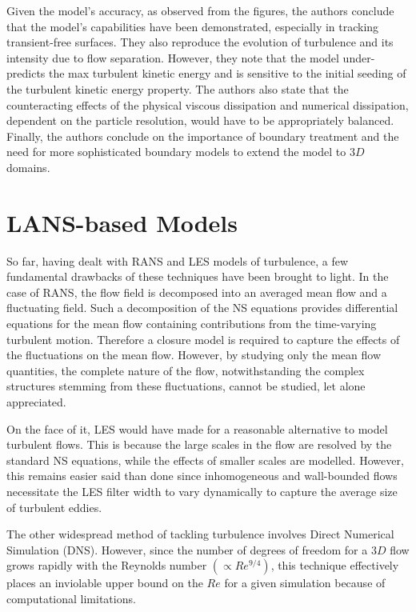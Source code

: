 Given the model’s accuracy, as observed from the figures, the authors conclude that the model’s capabilities have been demonstrated, especially in tracking transient-free surfaces. They also reproduce the evolution of turbulence and its intensity due to flow separation. 
However, they note that the model under-predicts the max turbulent kinetic energy and is sensitive to the initial seeding of the turbulent kinetic energy property.
The authors also state that the counteracting effects of the physical viscous dissipation and numerical dissipation, dependent on the particle resolution, would have to be appropriately balanced.
Finally, the authors conclude on the importance of boundary treatment and the need for more sophisticated boundary models to extend the model to $3D$ domains.


\section{LANS-based Models}
\label{sec:lans-based-model}
So far, having dealt with RANS and LES models of turbulence, a few fundamental drawbacks of these techniques have been brought to light.
In the case of RANS, the flow field is decomposed into
an averaged mean flow and a fluctuating field. Such a decomposition of the NS equations provides differential equations for the mean flow containing contributions from the time-varying turbulent motion. Therefore a closure model is required to capture the effects of the fluctuations on the mean flow. However, by studying only the mean flow quantities, the complete nature of the flow, notwithstanding the complex structures stemming from these fluctuations, cannot be studied, let alone appreciated.

On the face of it, LES would have made for a reasonable alternative to model turbulent flows. This is because the large scales in the flow are resolved by the standard NS equations, while the effects of smaller scales are modelled. However, this remains easier said than done since inhomogeneous and wall-bounded flows necessitate the LES filter width to vary dynamically to capture the average size of turbulent eddies.

The other widespread method of tackling turbulence involves Direct Numerical Simulation (DNS). However, since the number of degrees of freedom for a $3D$ flow grows rapidly with the Reynolds number $(\propto Re^{9/4})$, this technique effectively places an inviolable upper bound on the $Re$ for a given simulation because of computational limitations.


